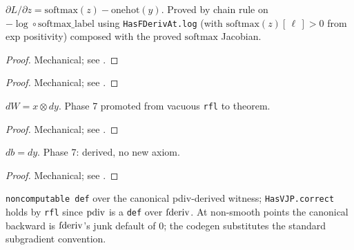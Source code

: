 \begin{theorem}
  \label{ax:softmaxCE_grad}
  \leanok
  \(\partial L / \partial z = \mathrm{softmax}(z) - \mathrm{onehot}(y)\).
  Proved by chain rule on \(-\log \circ \mathrm{softmax\_label}\) using
  \texttt{HasFDerivAt.log} (with \(\mathrm{softmax}(z)[\,\ell\,] > 0\) from
  exp positivity) composed with the proved \(\mathrm{softmax}\) Jacobian.
\end{theorem}

\begin{proof}
\leanok
Mechanical; see .
\end{proof}

\begin{theorem}
  \label{thm:dense_has_vjp}
  \leanok
\end{theorem}

\begin{proof}
\leanok
Mechanical; see .
\end{proof}

\begin{theorem}
  \label{thm:dense_weight_grad_correct}
  \leanok
  \(dW = x \otimes dy\). Phase 7 promoted from vacuous \texttt{rfl} to theorem.
\end{theorem}

\begin{proof}
\leanok
Mechanical; see .
\end{proof}

\begin{theorem}
  \label{thm:dense_bias_grad_correct}
  \leanok
  \(db = dy\). Phase 7: derived, no new axiom.
\end{theorem}

\begin{proof}
\leanok
Mechanical; see .
\end{proof}

\begin{definition}
  \label{thm:relu_has_vjp}
  \leanok
  \texttt{noncomputable def} over the canonical pdiv-derived
  witness; \texttt{HasVJP.correct} holds by \texttt{rfl} since
  \(\operatorname{pdiv}\) is a \texttt{def} over \(\operatorname{fderiv}\). At non-smooth
  points the canonical backward is \(\operatorname{fderiv}\)'s junk default
  of \(0\); the codegen substitutes the standard subgradient
  convention.
\end{definition}

